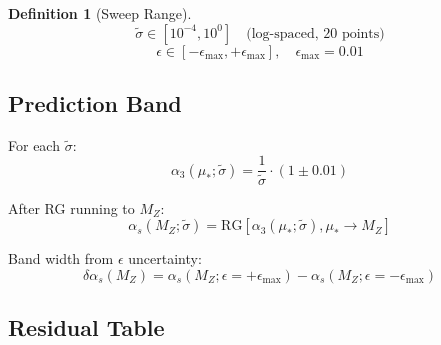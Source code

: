 \documentclass[11pt,a4paper]{article}
\theoremstyle{definition}
\newtheorem{definition}{Definition}[section]
\begin{document}
\begin{definition}[Sweep Range]
\label{def:sweep}
\begin{equation}
\label{eq:sweep-range}
\tilde{\sigma} \in [10^{-4}, 10^{0}] \quad \text{(log-spaced, 20 points)}
\end{equation}
\begin{equation}
\label{eq:eps-range}
\epsilon \in [-\epsilon_{\max}, +\epsilon_{\max}], \quad \epsilon_{\max} = 0.01
\end{equation}
\end{definition}

\subsection{Prediction Band}
\label{subsec:prediction-band}

For each $\tilde{\sigma}$:
\begin{equation}
\label{eq:alpha-at-mustar}
\alpha_3(\mu_*; \tilde{\sigma}) = \frac{1}{\tilde{\sigma}} \cdot (1 \pm 0.01)
\end{equation}

After RG running to $M_Z$:
\begin{equation}
\label{eq:alpha-at-mz}
\alpha_s(M_Z; \tilde{\sigma}) = \text{RG}[\alpha_3(\mu_*; \tilde{\sigma}), \mu_* \to M_Z]
\end{equation}

Band width from $\epsilon$ uncertainty:
\begin{equation}
\label{eq:band-width}
\delta\alpha_s(M_Z) = \alpha_s(M_Z; \epsilon = +\epsilon_{\max}) - \alpha_s(M_Z; \epsilon = -\epsilon_{\max})
\end{equation}

\subsection{Residual Table}
\label{subsec:residual-table}
\end{document}
